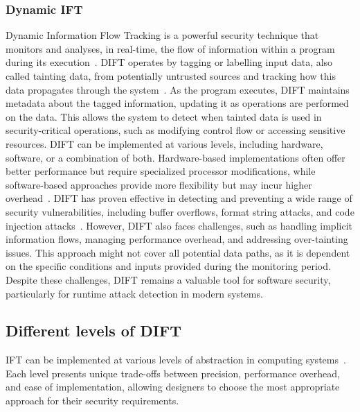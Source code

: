 \subsubsection{Dynamic IFT}
Dynamic Information Flow Tracking is a powerful security technique that monitors and analyses, in real-time, the flow of information within a program during its execution~\cite{CGDJ-21-micromac}. DIFT operates by tagging or labelling input data, also called tainting data, from potentially untrusted sources and tracking how this data propagates through the system~\cite{SLD-04-sigplan}. As the program executes, DIFT maintains metadata about the tagged information, updating it as operations are performed on the data. This allows the system to detect when tainted data is used in security-critical operations, such as modifying control flow or accessing sensitive resources. DIFT can be implemented at various levels, including hardware, software, or a combination of both. Hardware-based implementations often offer better performance but require specialized processor modifications, while software-based approaches provide more flexibility but may incur higher overhead~\cite{CGDJ-21-micromac}. DIFT has proven effective in detecting and preventing a wide range of security vulnerabilities, including buffer overflows, format string attacks, and code injection attacks~\cite{SLD-04-sigplan}. However, DIFT also faces challenges, such as handling implicit information flows, managing performance overhead, and addressing over-tainting issues.
This approach might not cover all potential data paths, as it is dependent on the specific conditions and inputs provided during the monitoring period.
Despite these challenges, DIFT remains a valuable tool for software security, particularly for runtime attack detection in modern systems.

\subsection{Different levels of DIFT}
IFT can be implemented at various levels of abstraction in computing systems~\cite{HAK-21-acmcsur, BSMCVEJCO-21-acmcsur,CGDJ-21-micromac}. Each level presents unique trade-offs between precision, performance overhead, and ease of implementation, allowing designers to choose the most appropriate approach for their security requirements.

